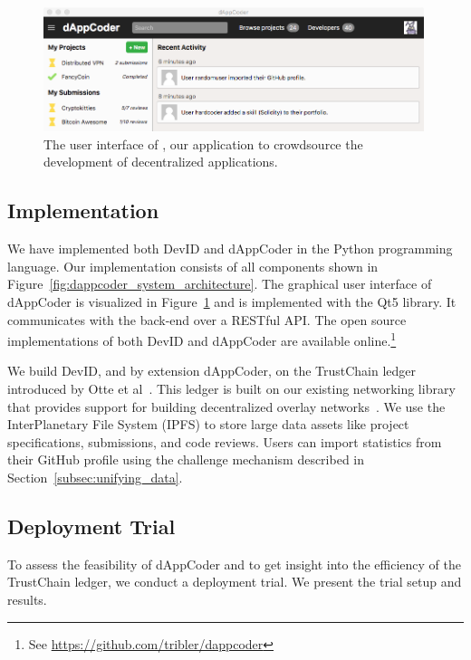 \begin{figure}[t!]
	\centering
	\includegraphics[width=0.99\textwidth]{devid/resources/gui_smaller.png}
	\caption{The user interface of \Dappcoder{}, our application to crowdsource the development of decentralized applications.}
	\label{fig:dappcoder}
\end{figure}

\subsection{Implementation}
We have implemented both DevID and dAppCoder in the Python programming language.
Our implementation consists of all components shown in Figure~\ref{fig:dappcoder_system_architecture}.
The graphical user interface of dAppCoder is visualized in Figure~\ref{fig:dappcoder} and is implemented with the Qt5 library.
It communicates with the back-end over a RESTful API.
The open source implementations of both DevID and dAppCoder are available online.\footnote{See \url{https://github.com/tribler/dappcoder}}

We build DevID, and by extension dAppCoder, on the TrustChain ledger introduced by Otte et al~\cite{otte2017trustchain}.
This ledger is built on our existing networking library that provides support for building decentralized overlay networks~\cite{ipv8}.
We use the InterPlanetary File System (IPFS) to store large data assets like project specifications, submissions, and code reviews.
Users can import statistics from their GitHub profile using the challenge mechanism described in Section~\ref{subsec:unifying_data}.

\subsection{Deployment Trial}
To assess the feasibility of dAppCoder and to get insight into the efficiency of the TrustChain ledger, we conduct a deployment trial.
We present the trial setup and results.

